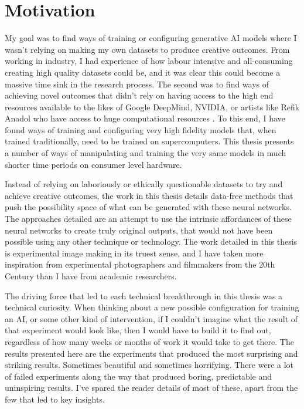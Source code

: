 \section{Motivation}

My goal was to find ways of training or configuring generative AI models where I wasn’t relying on making my own datasets to produce creative outcomes. 
From working in industry, I had experience of how labour intensive and all-consuming creating high quality datasets could be, and it was clear this could become a massive time sink in the research process. 
The second was to find ways of achieving novel outcomes that didn’t rely on having access to the high end resources available to the likes of Google DeepMind, NVIDIA, or artists like Refik Anadol who have access to huge computational resources \citep{caulfield2022refik}. 
To this end, I have found ways of training and configuring very high fidelity models that, when trained traditionally, need to be trained on supercomputers. 
This thesis presents a number of ways of manipulating and training the very same models in much shorter time periods on consumer level hardware. 

Instead of relying on laboriously or ethically questionable datasets to try and achieve creative outcomes, the work in this thesis details data-free methods that push the possibility space of what can be generated with these neural networks. 
The approaches detailed are an attempt to use the intrinsic affordances of these neural networks to create truly original outputs, that would not have been possible using any other technique or technology. 
The work detailed in this thesis is experimental image making in its truest sense, and I have taken more inspiration from experimental photographers and filmmakers from the 20th Century than I have from academic researchers.

The driving force that led to each technical breakthrough in this thesis was a technical curiosity. 
When thinking about a new possible configuration for training an AI, or some other kind of intervention, if I couldn’t imagine what the result of that experiment would look like, then I would have to build it to find out, regardless of how many weeks or months of work it would take to get there. 
The results presented here are the experiments that produced the most surprising and striking results. 
Sometimes beautiful and sometimes horrifying. 
There were a lot of failed experiments along the way that produced boring, predictable and uninspiring results. 
I’ve spared the reader details of most of these, apart from the few that led to key insights.

